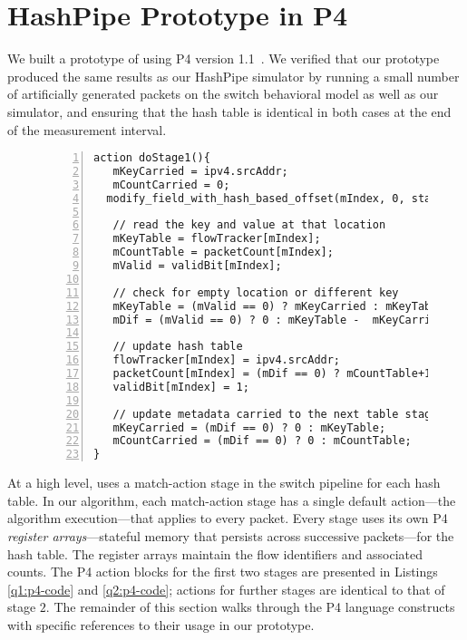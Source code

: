 \section{HashPipe Prototype in P4}
\label{sec:prototype}


We built a prototype of \TheSystem using P4 version 1.1~\cite{p4-v1.1-spec}.  We
verified that our prototype produced the same results as our HashPipe simulator
by running a small number of artificially generated packets on the switch
behavioral model \cite{p4-bm} as well as our simulator, and ensuring that the
hash table is identical in both cases at the end of the measurement interval.

\begin{figure}
 \begin{lstlisting}[basicstyle=\footnotesize, caption=
  HashPipe stage with insertion of new flow. Fields prefixed with m are metadata fields., label=q1:p4-code, captionpos=b, basicstyle=\footnotesize, breaklines = true,
numbers=left, xleftmargin=2em,frame=single,framexleftmargin=2.0em]
 action doStage1(){
   mKeyCarried = ipv4.srcAddr;
   mCountCarried = 0;
  modify_field_with_hash_based_offset(mIndex, 0, stage1Hash, 32);

   // read the key and value at that location
   mKeyTable = flowTracker[mIndex];
   mCountTable = packetCount[mIndex];
   mValid = validBit[mIndex];

   // check for empty location or different key
   mKeyTable = (mValid == 0) ? mKeyCarried : mKeyTable;
   mDif = (mValid == 0) ? 0 : mKeyTable -  mKeyCarried;

   // update hash table
   flowTracker[mIndex] = ipv4.srcAddr;
   packetCount[mIndex] = (mDif == 0) ? mCountTable+1: 1;
   validBit[mIndex] = 1;

   // update metadata carried to the next table stage
   mKeyCarried = (mDif == 0) ? 0 : mKeyTable;
   mCountCarried = (mDif == 0) ? 0 : mCountTable;  
}
 \end{lstlisting}
 \end{figure}

At a high level, \TheSystem uses a match-action stage in the switch pipeline for
each hash table. In our algorithm, each match-action stage has a single default
action---the algorithm execution---that applies to every packet. Every stage
uses its own P4 \emph{register arrays}---stateful memory that persists across
successive packets---for the hash table. The register arrays maintain the flow
identifiers and associated counts.
The P4 action blocks for the first two stages are
presented in Listings \ref{q1:p4-code} and \ref{q2:p4-code}; actions for
further stages are identical to that of stage $2$. The remainder
of this
section walks through the P4 language constructs with specific references to
their usage in our \TheSystem prototype.\\

